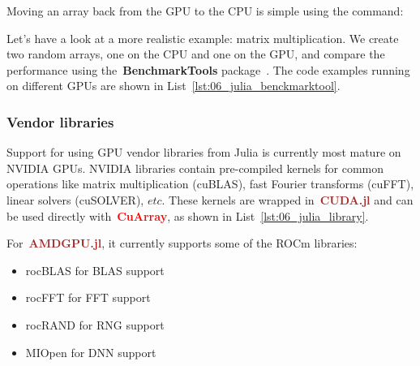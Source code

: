 \par
Moving an array back from the GPU to the CPU is simple using the command:



\par
Let’s have a look at a more realistic example: matrix multiplication.
We create two random arrays, one on the CPU and one on the GPU, and compare the performance using the~\textbf{BenchmarkTools} package~\cite{benchmarktools}.
The code examples running on different GPUs are shown in List~\ref{lst:06_julia_benckmarktool}.





\subsubsection{Vendor libraries}


\par
Support for using GPU vendor libraries from Julia is currently most mature on NVIDIA GPUs.
NVIDIA libraries contain pre-compiled kernels for common operations like matrix multiplication (cuBLAS), fast Fourier transforms (cuFFT), linear solvers (cuSOLVER), $etc$.
These kernels are wrapped in~\textbf{\textcolor{brown}{CUDA.jl}} and can be used directly with~\textbf{\textcolor{red}{CuArray}}, as shown in List~\ref{lst:06_julia_library}.





\par
For~\textbf{\textcolor{brown}{AMDGPU.jl}}, it currently supports some of the ROCm libraries:
\begin{itemize}
    \item rocBLAS for BLAS support
    \item rocFFT for FFT support
    \item rocRAND for RNG support
    \item MIOpen for DNN support
\end{itemize}


